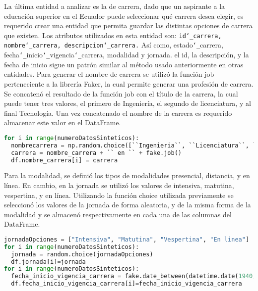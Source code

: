 \documentclass[10pt, oneside,spanish]{article}   	%
\begin{document}
 La última entidad a analizar es la de carrera, dado que un aspirante a la educación superior en el Ecuador puede seleccionar qué carrera desea elegir, es requerido crear una entidad que permita guardar las distintas opciones de carrera que existen. Los atributos utilizados en esta entidad son: \texttt{id\texttt{\char`_}carrera, nombre\texttt{\char`_}carrera, descripcion\texttt{\char`_}carrera.} 
 Así como, estado\texttt{\char`_}carrera, fecha\texttt{\char`_}inicio\texttt{\char`_}vigencia\texttt{\char`_}carrera, modalidad y jornada. el id, la descripción, y la fecha de inicio sigue un patrón similar al método usado anteriormente en otras entidades. Para generar el nombre de carrera se utilizó la función job perteneciente a la librería Faker, la cual permite generar una profesión de carrera. Se concatenó el resultado de la función job con el título de la carrera, la cual puede tener tres valores, el primero de Ingeniería, el segundo de licenciatura, y al final Tecnología. Una vez concatenado el nombre de la carrera es requerido almacenar este valor en el DataFrame.
 
      \begin{lstlisting}[language=Python, caption=Python example,numbers=none,xleftmargin=.15in,xrightmargin=.15in]  
for i in range(numeroDatosSinteticos):
  nombrecarrera = np.random.choice([``Ingenieria``, ``Licenciatura``, ``Tecnologia``], p=[1/3, 1/3,1/3])
  carrera = nombre_carrera + `` en `` + fake.job()
  df.nombre_carrera[i] = carrera
  \end{lstlisting}
 
 Para la modalidad, se definió los tipos de modalidades presencial, distancia, y en línea. En cambio, en la jornada se utilizó los valores de intensiva, matutina, vespertina, y en línea. Utilizando la función choice utilizada previamente se seleccionó los valores de la jornada de forma aleatoria, y de la misma forma de la modalidad y se almacenó respectivamente en cada una de las columnas del DataFrame.
     
       \begin{lstlisting}[language=Python, caption=Python example,numbers=none,xleftmargin=.15in,xrightmargin=.15in]  
jornadaOpciones = ["Intensiva", "Matutina", "Vespertina", "En linea"]
for i in range(numeroDatosSinteticos):
  jornada = random.choice(jornadaOpciones)
  df.jornada[i]=jornada
for i in range(numeroDatosSinteticos):
  fecha_inicio_vigencia_carrera = fake.date_between(datetime.date(1940, 1, 1), datetime.date(1980, 1, 1))
  df.fecha_inicio_vigencia_carrera[i]=fecha_inicio_vigencia_carrera
  \end{lstlisting}
\end{document}
